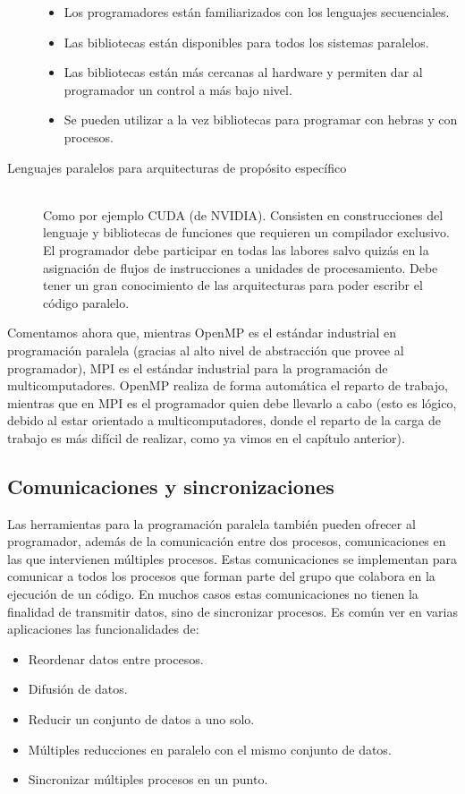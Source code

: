 \begin{description}
        \begin{itemize}
            \item Los programadores están familiarizados con los lenguajes secuenciales.
            \item Las bibliotecas están disponibles para todos los sistemas paralelos.
            \item Las bibliotecas están más cercanas al hardware y permiten dar al programador un control a más bajo nivel.
            \item Se pueden utilizar a la vez bibliotecas para programar con hebras y con procesos.
        \end{itemize}
    \item [Lenguajes paralelos para arquitecturas de propósito específico]~\\
        Como por ejemplo CUDA (de NVIDIA). Consisten en construcciones del lenguaje y bibliotecas de funciones que requieren un compilador exclusivo. El programador debe participar en todas las labores salvo quizás en la asignación de flujos de instrucciones a unidades de procesamiento. Debe tener un gran conocimiento de las arquitecturas para poder escribr el código paralelo.
\end{description}

Comentamos ahora que, mientras OpenMP es el estándar industrial en programación paralela (gracias al alto nivel de abstracción que provee al programador), MPI es el estándar industrial para la programación de multicomputadores. OpenMP realiza de forma automática el reparto de trabajo, mientras que en MPI es el programador quien debe llevarlo a cabo (esto es lógico, debido al estar orientado a multicomputadores, donde el reparto de la carga de trabajo es más difícil de realizar, como ya vimos en el capítulo anterior).

\subsection{Comunicaciones y sincronizaciones}
Las herramientas para la programación paralela también pueden ofrecer al programador, además de la comunicación entre dos procesos, comunicaciones en las que intervienen múltiples procesos. Estas comunicaciones se implementan para comunicar a todos los procesos que forman parte del grupo que colabora en la ejecución de un código. En muchos casos estas comunicaciones no tienen la finalidad de transmitir datos, sino de sincronizar procesos. Es común ver en varias aplicaciones las funcionalidades de:
\begin{itemize}
    \item Reordenar datos entre procesos.
    \item Difusión de datos.
    \item Reducir un conjunto de datos a uno solo.
    \item Múltiples reducciones en paralelo con el mismo conjunto de datos.
    \item Sincronizar múltiples procesos en un punto.
\end{itemize}

